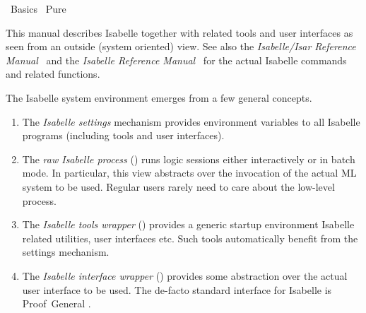 %
\begin{isabellebody}%
\def\isabellecontext{Basics}%
%
\isadelimtheory
\isanewline
\isanewline
%
\endisadelimtheory
%
\isatagtheory
{}\isamarkupfalse%
\ Basics\isanewline
{}\ Pure\isanewline
{}%
\endisatagtheory
{\isafoldtheory}%
%
\isadelimtheory
%
\endisadelimtheory
%
\isamarkuptrue%
%
\begin{isamarkuptext}%
This manual describes Isabelle together with related tools and user
  interfaces as seen from an outside (system oriented) view.  See also
  the \emph{Isabelle/Isar Reference Manual}~\cite{isabelle-isar-ref}
  and the \emph{Isabelle Reference Manual}~\cite{isabelle-ref} for the
  actual Isabelle commands and related functions.

  \medskip The Isabelle system environment emerges from a few general
  concepts.

  \begin{enumerate}

  \item The \emph{Isabelle settings} mechanism provides environment
  variables to all Isabelle programs (including tools and user
  interfaces).

  \item The \emph{raw Isabelle process} (\hyperlink{executable.isabelle-process}{\mbox{}}) runs logic sessions either interactively or in
  batch mode.  In particular, this view abstracts over the invocation
  of the actual ML system to be used.  Regular users rarely need to
  care about the low-level process.

  \item The \emph{Isabelle tools wrapper} (\hyperlink{executable.isabelle}{\mbox{}})
  provides a generic startup environment Isabelle related utilities,
  user interfaces etc.  Such tools automatically benefit from the
  settings mechanism.

  \item The \emph{Isabelle interface wrapper} (\hyperlink{executable.isabelle-interface}{\mbox{}}) provides some abstraction over the actual
  user interface to be used.  The de-facto standard interface for
  Isabelle is Proof~General \cite{proofgeneral}.


\end{enumerate}
\end{isamarkuptext}
\end{isabellebody}
